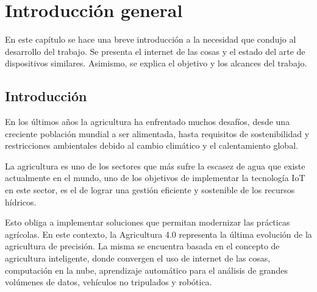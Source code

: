 
\chapter{Introducción general} %
En este capítulo se hace una breve introducción a la necesidad que condujo al desarrollo del trabajo. Se presenta el internet de las cosas y el estado del arte de dispositivos similares. Asimismo, se explica el objetivo y los alcances del trabajo.
\label{Chapter1} %
\label{IntroGeneral}


\newcommand{\keyword}[1]{\textbf{#1}}
\newcommand{\tabhead}[1]{\textbf{#1}}
\newcommand{\code}[1]{\texttt{#1}}
\newcommand{\file}[1]{\texttt{\bfseries#1}}
\newcommand{\option}[1]{\texttt{\itshape#1}}
\newcommand{\grados}{$^{\circ}$}



\section{Introducción}
En los últimos años la agricultura ha enfrentado muchos desafíos, desde una creciente población mundial a ser alimentada, hasta requisitos de sostenibilidad y restricciones ambientales debido al cambio climático y el calentamiento global.

La agricultura es uno de los sectores que más sufre la escasez de agua que existe actualmente en el mundo, uno de los objetivos de implementar la tecnología IoT en este sector, es el de lograr una gestión eficiente y sostenible de los recursos hídricos.

Esto obliga a implementar soluciones que permitan modernizar las prácticas agrícolas. En este contexto, la Agricultura 4.0 representa la última evolución de la  agricultura de precisión. La misma se encuentra basada en el concepto de agricultura inteligente, donde convergen el uso de internet de las cosas, computación
en la nube, aprendizaje automático para el análisis de grandes volúmenes de datos, vehículos no tripulados y robótica\citep{Agriculture4.0}.

